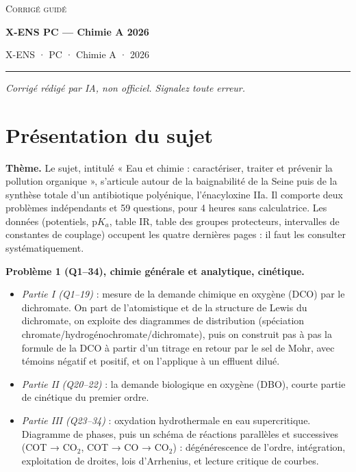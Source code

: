 \documentclass[11pt,a4paper]{article}
\providecommand{\tightlist}{\setlength{\itemsep}{0pt}\setlength{\parskip}{0pt}}
\begin{document}
\thispagestyle{plain}
\begin{center}
  {\small\scshape Corrigé guidé}\par\smallskip
  {\LARGE\bfseries X-ENS PC — Chimie A 2026\par}\medskip
  {\large X-ENS · PC · Chimie A · 2026\par}
\end{center}
\vspace{2pt}\hrule\vspace{8pt}

\emph{Corrigé rédigé par IA, non officiel. Signalez toute erreur.}

\hypertarget{pruxe9sentation-du-sujet}{%
\section{Présentation du sujet}\label{pruxe9sentation-du-sujet}}

\textbf{Thème.} Le sujet, intitulé « Eau et chimie : caractériser, traiter et prévenir la pollution organique », s'articule autour de la baignabilité de la Seine puis de la synthèse totale d'un antibiotique polyénique, l'énacyloxine IIa. Il comporte deux problèmes indépendants et 59 questions, pour 4 heures sans calculatrice. Les données (potentiels, p\(K_a\), table IR, table des groupes protecteurs, intervalles de constantes de couplage) occupent les quatre dernières pages : il faut les consulter systématiquement.

\textbf{Problème 1 (Q1--34), chimie générale et analytique, cinétique.}

\begin{itemize}
\tightlist
\item
  \emph{Partie I (Q1--19)} : mesure de la demande chimique en oxygène (DCO) par le dichromate. On part de l'atomistique et de la structure de Lewis du dichromate, on exploite des diagrammes de distribution (spéciation chromate/hydrogénochromate/dichromate), puis on construit pas à pas la formule de la DCO à partir d'un titrage en retour par le sel de Mohr, avec témoins négatif et positif, et on l'applique à un effluent dilué.
\item
  \emph{Partie II (Q20--22)} : la demande biologique en oxygène (DBO), courte partie de cinétique du premier ordre.
\item
  \emph{Partie III (Q23--34)} : oxydation hydrothermale en eau supercritique. Diagramme de phases, puis un schéma de réactions parallèles et successives (COT → CO\(_2\), COT → CO → CO\(_2\)) : dégénérescence de l'ordre, intégration, exploitation de droites, lois d'Arrhenius, et lecture critique de courbes.
\end{itemize}
\end{document}
